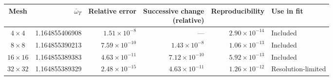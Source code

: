 \begin{tabular}{@{}c r r r r l@{}}
\toprule
Mesh & $\bar{\omega}_T$ & Relative error & \shortstack{Successive change\\(relative)} & Reproducibility & Use in fit \\
\midrule
$4\times4$ & 1.164855406908 & $1.51\times10^{-8}$ & --- & $2.90\times10^{-14}$ & Included \\
$8\times8$ & 1.164855390213 & $7.59\times10^{-10}$ & $1.43\times10^{-8}$ & $1.06\times10^{-13}$ & Included \\
$16\times16$ & 1.164855389383 & $4.63\times10^{-11}$ & $7.12\times10^{-10}$ & $5.92\times10^{-13}$ & Included \\
$32\times32$ & 1.164855389329 & $2.48\times10^{-15}$ & $4.63\times10^{-11}$ & $1.26\times10^{-12}$ & Resolution-limited \\
\bottomrule
\end{tabular}
